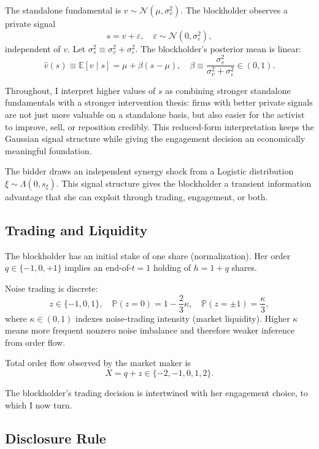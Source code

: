 \documentclass[11pt]{article}
\newcommand{\E}{\mathbb{E}}
\newcommand{\PP}{\mathbb{P}}
\newcommand{\1}{\mathbf{1}}
\begin{document}
The standalone fundamental is $v \sim \mathcal{N}(\mu, \sigma_v^2)$. The blockholder observes a private signal
\[
s = v + \varepsilon, \quad \varepsilon \sim \mathcal{N}(0, \sigma_\varepsilon^2),
\]
independent of $v$. Let $\sigma_s^2 \equiv \sigma_v^2 + \sigma_\varepsilon^2$. The blockholder's posterior mean is linear:
\[
\hat{v}(s) \equiv \E[v \mid s] = \mu + \beta(s - \mu), \quad \beta \equiv \frac{\sigma_v^2}{\sigma_v^2 + \sigma_\varepsilon^2} \in (0,1).
\]

Throughout, I interpret higher values of $s$ as combining stronger standalone fundamentals with a stronger intervention thesis: firms with better private signals are not just more valuable on a standalone basis, but also easier for the activist to improve, sell, or reposition credibly. This reduced-form interpretation keeps the Gaussian signal structure while giving the engagement decision an economically meaningful foundation.

The bidder draws an independent synergy shock from a Logistic distribution $\xi \sim \Lambda(0, s_\xi)$. This signal structure gives the blockholder a transient information advantage that she can exploit through trading, engagement, or both.

%
\subsection{Trading and Liquidity}
%

The blockholder has an initial stake of one share (normalization). Her order $q \in \{-1, 0, +1\}$ implies an end-of-$t=1$ holding of $h = 1 + q$ shares.

Noise trading is discrete:
\[
z \in \{-1, 0, 1\}, \quad \PP(z = 0) = 1 - \frac{2}{3}\kappa, \quad \PP(z = \pm 1) = \frac{\kappa}{3},
\]
where $\kappa \in (0, 1)$ indexes noise-trading intensity (market liquidity). Higher $\kappa$ means more frequent nonzero noise imbalance and therefore weaker inference from order flow.

Total order flow observed by the market maker is
\[
X = q + z \in \{-2, -1, 0, 1, 2\}.
\]

The blockholder's trading decision is intertwined with her engagement choice, to which I now turn.

%
\subsection{Disclosure Rule}
%
\end{document}
